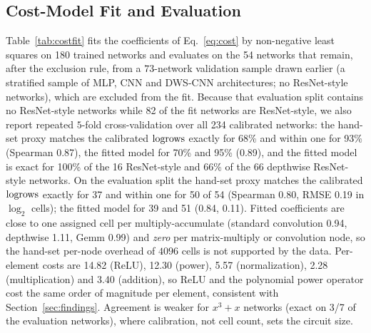 



\subsection{Cost-Model Fit and Evaluation}

Table~\ref{tab:costfit} fits the coefficients of Eq.~\eqref{eq:cost} by non-negative least squares on 180 trained networks and evaluates on the 54 networks that remain, after the exclusion rule, from a $73$-network validation sample drawn earlier (a stratified sample of MLP, CNN and DWS-CNN architectures; no ResNet-style networks), which are excluded from the fit.
Because that evaluation split contains no ResNet-style networks while 82 of the fit networks are ResNet-style, we also report repeated $5$-fold cross-validation over all 234 calibrated networks: the hand-set proxy matches the calibrated $\mathrm{logrows}$ exactly for 68\% and within one for 93\% (Spearman 0.87), the fitted model for 70\% and 95\% (0.89), and the fitted model is exact for 100\% of the 16 ResNet-style and 66\% of the 66 depthwise ResNet-style networks.
On the evaluation split the hand-set proxy matches the calibrated $\mathrm{logrows}$ exactly for 37 and within one for 50 of 54 (Spearman 0.80, RMSE 0.19 in $\log_2$ cells);
the fitted model for 39 and 51 (0.84, 0.11).  Fitted coefficients are close to one assigned cell per multiply-accumulate (standard convolution 0.94, depthwise
1.11, Gemm 0.99) and \emph{zero} per matrix-multiply or convolution node, so the hand-set per-node overhead of $4096$ cells is not supported by the data.  Per-element costs are
14.82 (ReLU), 12.30 (power), 5.57 (normalization), 2.28 (multiplication) and 3.40 (addition), so ReLU and the polynomial power operator cost the same order of magnitude per element, consistent
with Section~\ref{sec:findings}.  Agreement is weaker for $x^3{+}x$ networks (exact on 3/7 of the evaluation networks), where calibration, not cell count, sets the circuit size.

